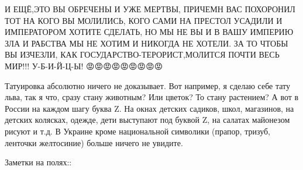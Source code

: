И ЕЩЁ,ЭТО ВЫ ОБРЕЧЕНЫ И УЖЕ МЕРТВЫ, ПРИЧЕМН ВАС ПОХОРОНИЛ ТОТ НА КОГО ВЫ МОЛИЛИСЬ, КОГО САМИ НА ПРЕСТОЛ УСАДИЛИ И ИМПЕРАТОРОМ ХОТИТЕ СДЕЛАТЬ, НО МЫ НЕ ВЫ И В ВАШУ ИМПЕРИЮ ЗЛА И РАБСТВА МЫ НЕ ХОТИМ И НИКОГДА НЕ ХОТЕЛИ.
ЗА ТО ЧТОБЫ ВЫ ИЗЧЕЗЛИ, КАК ГОСУДАРСТВО-ТЕРОРИСТ,МОЛИТСЯ ПОЧТИ ВЕСЬ МИР!!!
У-Б-И-Й-Ц-Ы! 😡😡😡😡😡😡😡😡😡


Татуировка абсолютно ничего не доказывает. Вот например, я сделаю себе тату
льва, так я что, сразу стану животным? Или цветок? То стану растением? А вот в
России на каждом шагу буква Z. На окнах детских садиков, школ, магазинов, на
детских колясках, одежде, дети выступают под буквой Z, на салатах майонезом
рисуют и т.д. В Украине кроме национальной символики (прапор, тризуб, ленточки
желтосиние) больше ничего не увидите.

Заметки на полях::

